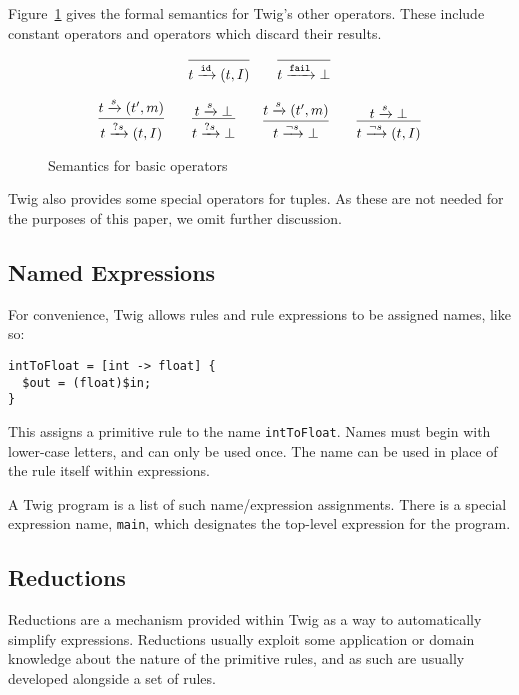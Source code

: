 Figure~\ref{semantics:basic} gives the formal semantics for Twig's other
operators. These include constant operators and operators which discard their
results.

\begin{figure}[ht]
\label{semantics:basic}
\[
\infer{t \arr{\mathtt{id}} (t,I)}{}
\qquad
\infer{t \arr{\mathtt{fail}} \bot}{}
\]

\[
\infer{t \arr{?s} (t,I)}{t \arr{s} (t',m)}
\qquad 
\infer{t \arr{?s} \bot}{t \arr{s} \bot}
\qquad
\infer{t \arr{\lnot s} \bot}{t \arr{s} (t',m)}
\qquad 
\infer{t \arr{\lnot s} (t,I)}{t \arr{s} \bot}
\]

\caption{Semantics for basic operators}
\end{figure}

Twig also provides some special operators for tuples. As these are not needed
for the purposes of this paper, we omit further discussion.

\subsection{Named Expressions}
\label{section:names}

For convenience, Twig allows rules and rule expressions to be assigned names,
like so:

\begin{verbatim}
intToFloat = [int -> float] {
  $out = (float)$in;
}
\end{verbatim}

This assigns a primitive rule to the name \texttt{intToFloat}. Names must begin
with lower-case letters, and can only be used once. The name can be used in
place of the rule itself within expressions.

A Twig program is a list of such name/expression assignments. There is a
special expression name, \texttt{main}, which designates the top-level
expression for the program.

\subsection{Reductions}
\label{sec:reductions}

Reductions are a mechanism provided within Twig as a way to automatically
simplify expressions. Reductions usually exploit some application or domain
knowledge about the nature of the primitive rules, and as such are usually
developed alongside a set of rules.

